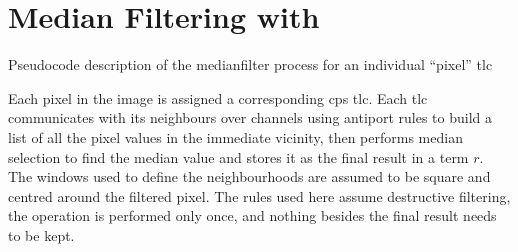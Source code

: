 \section{Median Filtering with }\label{sec:medianfilter}

\begin{algorithm}
\DontPrintSemicolon
{}
\caption{\label{alg:median:median}Pseudocode description of the \gls{medianfilter} process for an individual ``pixel'' \gls{tlc}}
\end{algorithm}

Each pixel in the image is assigned a corresponding \gls{cps} \gls{tlc}.  Each \gls{tlc} communicates with its neighbours over channels using antiport rules to build a list of all the pixel values in the immediate vicinity, then performs median selection to find the median value and stores it as the final result in a term \(r\).  The windows used to define the neighbourhoods are assumed to be square and centred around the filtered pixel. The rules used here assume destructive filtering, \ie{} the operation is performed only once, and nothing besides the final result needs to be kept.

